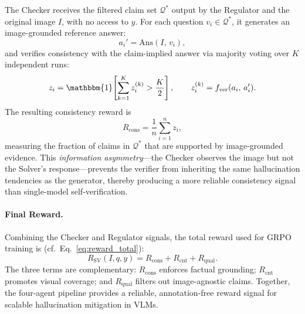 The Checker receives the filtered claim set $\mathcal{Q}^{\ast}$ output by
the Regulator and the original image $I$, with no access to
$y$.
For each question $v_i \in \mathcal{Q}^{\ast}$, it generates an
image-grounded reference answer:
\begin{equation}
    a_i' = \mathrm{Ans}(I,\, v_i),
\end{equation}
and verifies consistency with the claim-implied answer via majority voting
over $K$ independent runs:
\begin{equation}
    z_i = \mathbbm{1}\!\left[
        \sum_{k=1}^{K} z_i^{(k)} > \frac{K}{2}
    \right],
    \qquad
    z_i^{(k)} = f_{\mathrm{ver}}(a_i,\, a_i').
\end{equation}
The resulting consistency reward is
\begin{equation}
    R_{\mathrm{cons}} = \frac{1}{n} \sum_{i=1}^{n} z_i,
\end{equation}
measuring the fraction of claims in $\mathcal{Q}^{\ast}$ that are supported
by image-grounded evidence.
This \emph{information asymmetry}---the Checker observes the image but not
the Solver's response---prevents the verifier from inheriting the same
hallucination tendencies as the generator, thereby producing a more reliable
consistency signal than single-model self-verification.

\paragraph{Final Reward.}
Combining the Checker and Regulator signals, the total reward used for
GRPO training is (cf.\ Eq.~\eqref{eq:reward_total}):
\begin{equation}
    R_{\mathrm{SV}}(I, q, y)
    = R_{\mathrm{cons}} + R_{\mathrm{cnt}} + R_{\mathrm{qual}}.
\end{equation}
The three terms are complementary: $R_{\mathrm{cons}}$ enforces factual
grounding; $R_{\mathrm{cnt}}$ promotes visual coverage; and
$R_{\mathrm{qual}}$ filters out image-agnostic claims.
Together, the four-agent pipeline provides a reliable, annotation-free
reward signal for scalable hallucination mitigation in VLMs.
